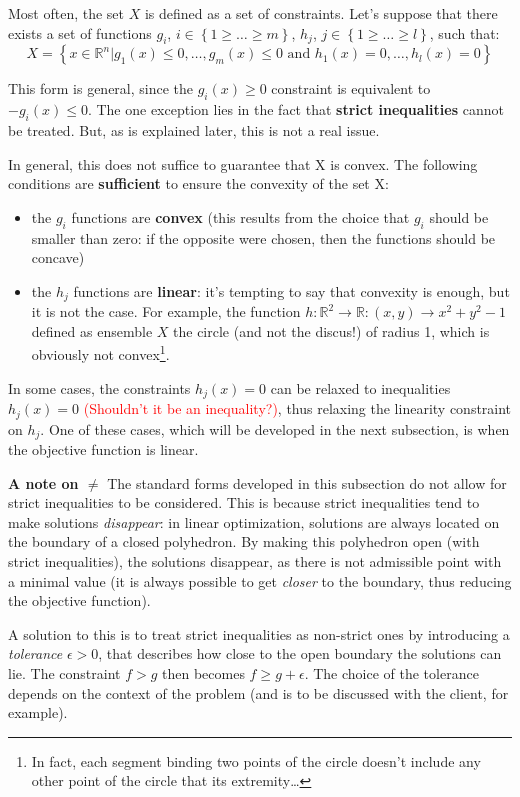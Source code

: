 Most often, the set $X$ is defined as a set of constraints. Let's suppose that there exists a set of functions $g_i$, $i \in \left\{1 \geq \dots \geq m \right\}$, $h_j$, $j \in \left\{ 1 \geq \dots \geq l \right\}$, such that:
$$X = \left\{ x \in \mathbb{R}^n | g_1(x) \leq 0, \dots, g_m(x) \leq 0 \text{ and } h_1(x)=0, \dots, h_l(x) = 0 \right\}$$

This form is general, since the $g_i(x) \geq 0$ constraint is equivalent to $-g_i(x) \leq 0$. The one exception lies in the fact that \textbf{strict inequalities} cannot be treated. But, as is explained later, this is not a real issue. 

In general, this does not suffice to guarantee that X is convex. The following conditions are \textbf{sufficient} to ensure the convexity of the set X:
\begin{itemize}
\item the $g_i$ functions are \textbf{convex} (this results from the choice that $g_i$ should be smaller than zero: if the opposite were chosen, then the functions should be concave)
\item the $h_j$ functions are \textbf{linear}: it's tempting to say that convexity is enough, but it is not the case. For example, the function $h:\mathbb{R}^2\rightarrow \mathbb{R}: (x,y) \rightarrow x^2+y^2 -1$ defined as ensemble $X$ the circle (and not the discus!) of radius 1, which is obviously not convex\footnote{In fact, each segment binding two points of the circle doesn't include any other point of the circle that its extremity\dots}.
\end{itemize}

In some cases, the constraints $h_j(x)=0$ can be relaxed to inequalities $h_j(x)=0$ \textcolor{red}{(Shouldn't it be an inequality?)}, thus relaxing the linearity constraint on $h_j$. One of these cases, which will be developed in the next subsection, is when the objective function is linear.


\begin{framed}
\textbf{A note on $\neq$} The standard forms developed in this subsection do not allow for strict inequalities to be considered. This is because strict inequalities tend to make solutions \textit{disappear}: in linear optimization, solutions are always located on the boundary of a closed polyhedron. By making this polyhedron open (with strict inequalities), the solutions disappear, as there is not admissible point with a minimal value (it is always possible to get \textit{closer} to the boundary, thus reducing the objective function).

A solution to this is to treat strict inequalities as non-strict ones by introducing a \textit{tolerance} $\epsilon > 0$, that describes how close to the open boundary the solutions can lie. The constraint $f>g$ then becomes $f \geq g+\epsilon$. The choice of the tolerance depends on the context of the problem (and is to be discussed with the client, for example).
\end{framed}

